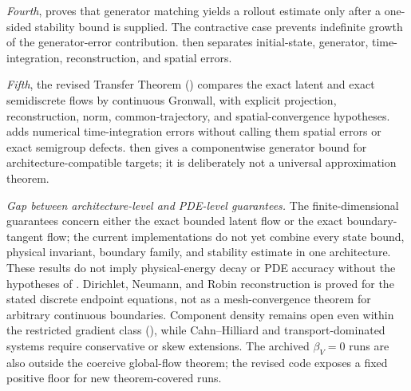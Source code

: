 \documentclass[hidelinks,review,nohypdvips,onefignum,onetabnum]{siamart220329}
\begin{document}
\emph{Fourth},  proves that generator matching yields a rollout estimate only after a one-sided stability bound is supplied.  The contractive case prevents indefinite growth of the generator-error contribution.   then separates initial-state, generator, time-integration, reconstruction, and spatial errors.

\emph{Fifth}, the revised Transfer Theorem () compares the exact latent and exact semidiscrete flows by continuous Gronwall, with explicit projection, reconstruction, norm, common-trajectory, and spatial-convergence hypotheses.  adds numerical time-integration errors without calling them spatial errors or exact semigroup defects.  then gives a componentwise generator bound for architecture-compatible targets; it is deliberately not a universal approximation theorem.

\emph{Gap between architecture-level and PDE-level guarantees.}
The finite-dimensional guarantees concern either the exact bounded latent flow or the exact boundary-tangent flow; the current implementations do not yet combine every state bound, physical invariant, boundary family, and stability estimate in one architecture.  These results do not imply physical-energy decay or PDE accuracy without the hypotheses of .  Dirichlet, Neumann, and Robin reconstruction is proved for the stated discrete endpoint equations, not as a mesh-convergence theorem for arbitrary continuous boundaries. Component density remains open even within the restricted gradient class (), while Cahn--Hilliard and transport-dominated systems require conservative or skew extensions. The archived $\beta_V=0$ runs are also outside the coercive global-flow theorem; the revised code exposes a fixed positive floor for new theorem-covered runs.
\end{document}
